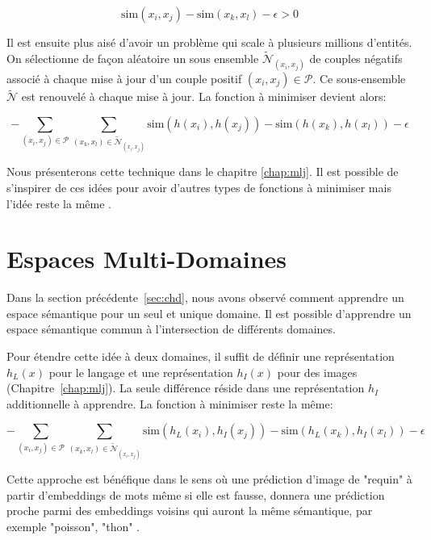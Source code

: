 \begin{equation}
\textrm{sim}(x_i, x_j) - \textrm{sim}(x_k, x_l) - \epsilon > 0
\end{equation}

Il est ensuite plus aisé d'avoir un problème qui scale à plusieurs millions
d'entités. On sélectionne de façon aléatoire un sous ensemble
$\tilde{\mathcal{N}}_{(x_i, x_j)}$ de couples négatifs associé à chaque mise à jour
d'un couple positif $(x_i, x_j)\in\mathcal{P}$.  Ce sous-ensemble
$\tilde{\mathcal{N}}$ est renouvelé à chaque mise à jour. La fonction à minimiser
devient alors:  

\begin{equation}
-\sum_{(x_i, x_j)\in\mathcal{P}}\sum_{(x_k, x_l)\in\tilde{\mathcal{N}}_{(x_i, x_j)}} \textrm{sim}(h(x_i), h(x_j)) - \textrm{sim}(h(x_k), h(x_l)) - \epsilon
\label{eq:min-sim}
\end{equation}

Nous présenterons cette technique \citep{image-wsabie} dans le chapitre
\ref{chap:mlj}. Il est possible de s'inspirer de ces idées pour avoir d'autres
types de fonctions à minimiser mais l'idée reste la même \citep{rnn58}.

\section{Espaces Multi-Domaines}

Dans la section précédente~\ref{sec:chd}, nous avons observé comment apprendre un espace
sémantique pour un seul et unique domaine. Il est possible d'apprendre un espace
sémantique commun à l'intersection de différents domaines.  

Pour étendre cette idée à deux domaines, il suffit de définir une
représentation $h_L(x)$ pour le langage et une représentation $h_I(x)$ pour des images
(Chapitre~\ref{chap:mlj}). La seule différence réside dans une
représentation $h_I$ additionnelle à apprendre. La fonction à minimiser
reste la même:

 \begin{equation}
-\sum_{(x_i, x_j)\in\mathcal{P}}\sum_{(x_k, x_l)\in\tilde{\mathcal{N}}_{(x_i, x_j)}} \textrm{sim}(h_L(x_i), h_I(x_j)) - \textrm{sim}(h_L(x_k), h_I(x_l)) - \epsilon
\end{equation}

Cette approche est bénéfique dans le sens où une prédiction d'image de "requin"
à partir d'embeddings de mots même si elle est fausse, donnera une prédiction
proche parmi des embeddings voisins qui auront la même sémantique, par exemple
"poisson", "thon" \citep{samy-extreme}.

